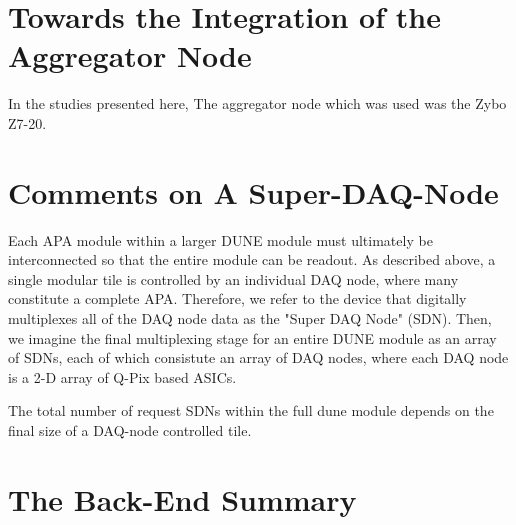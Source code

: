 \section{Towards the Integration of the Aggregator Node}

In the studies presented here, The aggregator node which was used was the Zybo Z7-20.

\section{Comments on A Super-DAQ-Node}

Each APA module within a larger DUNE module must ultimately be interconnected so that the entire module can be readout.
As described above, a single modular tile is controlled by an individual DAQ node, where many constitute a complete APA.
Therefore, we refer to the device that digitally multiplexes all of the DAQ node data as the "Super DAQ Node" (SDN).
Then, we imagine the final multiplexing stage for an entire DUNE module as an array of SDNs, each of which consistute an array of DAQ nodes, where each DAQ node is a 2-D array of Q-Pix based ASICs.

The total number of request SDNs within the full dune module depends on the final size of a DAQ-node controlled tile.


\section{The Back-End Summary}
